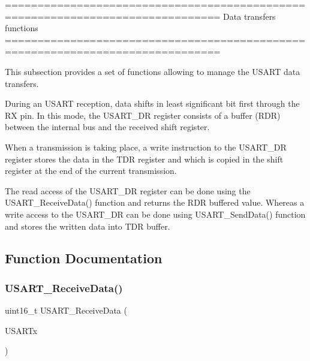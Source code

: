 \begin{DoxyVerb} ===============================================================================
                            Data transfers functions
 ===============================================================================  

  This subsection provides a set of functions allowing to manage the USART data 
  transfers.
  
  During an USART reception, data shifts in least significant bit first through 
  the RX pin. In this mode, the USART_DR register consists of a buffer (RDR) 
  between the internal bus and the received shift register.

  When a transmission is taking place, a write instruction to the USART_DR register 
  stores the data in the TDR register and which is copied in the shift register 
  at the end of the current transmission.

  The read access of the USART_DR register can be done using the USART_ReceiveData()
  function and returns the RDR buffered value. Whereas a write access to the USART_DR 
  can be done using USART_SendData() function and stores the written data into 
  TDR buffer.\end{DoxyVerb}
 

\subsection{Function Documentation}
\mbox{\label{group___u_s_a_r_t___group2_gac67a91845b0b1d54d31bdfb1c5e9867c}} 
\subsubsection{\texorpdfstring{U\+S\+A\+R\+T\+\_\+\+Receive\+Data()}{USART\_ReceiveData()}}
{\footnotesize\ttfamily uint16\+\_\+t U\+S\+A\+R\+T\+\_\+\+Receive\+Data (\begin{DoxyParamCaption}\item[{\hyperlink{struct_u_s_a_r_t___type_def}{U\+S\+A\+R\+T\+\_\+\+Type\+Def} $\ast$}]{U\+S\+A\+R\+Tx }\end{DoxyParamCaption})}



